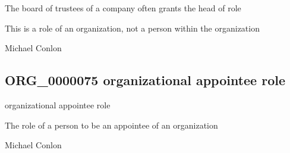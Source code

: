 \documentclass[letterpaper,10pt,english]{sphinxmanual}
\begin{document}
\begin{sphinxShadowBox}

\sphinxAtStartPar
The board of trustees of a company often grants the head of role
\end{sphinxShadowBox}

\begin{sphinxShadowBox}

\sphinxAtStartPar
This is a role of an organization, not a person within the organization
\end{sphinxShadowBox}

\begin{sphinxShadowBox}

\sphinxAtStartPar
Michael Conlon 
\end{sphinxShadowBox}
\begin{quote}

\ignorespaces \end{quote}


\subsection{ORG\_0000075 \sphinxhyphen{} organizational appointee role}
\label{\detokenize{doc-ORG_0000075:org-0000075-organizational-appointee-role}}\label{\detokenize{doc-ORG_0000075:index-0}}\label{\detokenize{doc-ORG_0000075::doc}}
\begin{sphinxShadowBox}

\sphinxAtStartPar
organizational appointee role
\end{sphinxShadowBox}

\begin{sphinxShadowBox}

\sphinxAtStartPar
The role of a person to be an appointee of an organization
\end{sphinxShadowBox}

\begin{sphinxShadowBox}

\sphinxAtStartPar
Michael Conlon 
\end{sphinxShadowBox}
\end{document}
